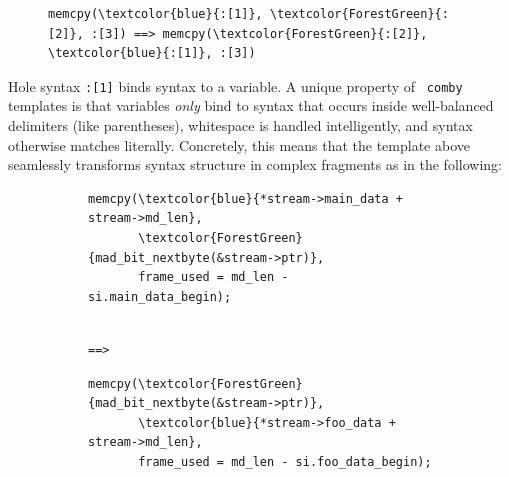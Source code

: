 \begin{figure}[!h]
\centering
\begin{BVerbatim}[commandchars=\\\{\}]
memcpy(\textcolor{blue}{:[1]}, \textcolor{ForestGreen}{:[2]}, :[3]) ==> memcpy(\textcolor{ForestGreen}{:[2]}, \textcolor{blue}{:[1]}, :[3])
\end{BVerbatim}
\end{figure}

Hole syntax \verb|:[1]| binds syntax to a variable. A unique property of {\tt
  comby} templates is that variables
\emph{only} bind to syntax that occurs
inside well-balanced delimiters (like parentheses), whitespace is handled intelligently, %
and syntax otherwise matches literally. %
Concretely, this means that the template above seamlessly transforms syntax structure in complex fragments as in the following:

\begin{figure}[!h]
\footnotesize
\begin{subfigure}[t]{.47\textwidth}
\centering
\begin{Verbatim}[commandchars=\\\{\}]
memcpy(\textcolor{blue}{*stream->main_data + stream->md_len},
       \textcolor{ForestGreen}{mad_bit_nextbyte(&stream->ptr)},
       frame_used = md_len - si.main_data_begin);
\end{Verbatim}
\end{subfigure}%
\begin{subfigure}[t]{.04\textwidth}
\begin{verbatim}

==>

\end{verbatim}
\end{subfigure}%
\begin{subfigure}[t]{.47\textwidth}
\begin{Verbatim}[commandchars=\\\{\}]
memcpy(\textcolor{ForestGreen}{mad_bit_nextbyte(&stream->ptr)},
       \textcolor{blue}{*stream->foo_data + stream->md_len},
       frame_used = md_len - si.foo_data_begin);
\end{Verbatim}
\end{subfigure}
\normalsize
\end{figure}

